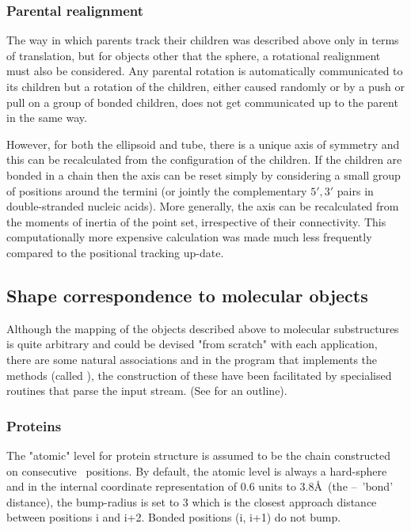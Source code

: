 \subsubsection{Parental realignment}

The way in which parents track their children was described above only in terms of
translation, but for objects other that the sphere, a rotational realignment must also
be considered.   Any parental rotation is automatically communicated to its children but
a rotation of the children, either caused randomly or by a push or pull on a group of
bonded children, does not get communicated up to the parent in the same way.

However, for both the ellipsoid and tube, there is a unique axis of symmetry and this can
be recalculated from the configuration of the children.  If the children are bonded
in a chain then the axis can be reset simply by considering a small group of positions
around the termini (or jointly the complementary $5',3'$ pairs in double-stranded
nucleic acids).   More generally, the axis can be recalculated from the moments
of inertia of the point set, irrespective of their connectivity.
This computationally more expensive calculation was made much less frequently
compared to the positional tracking up-date. 

\subsection{Shape correspondence to molecular objects}

Although the mapping of the objects described above to molecular substructures is quite
arbitrary and could be devised "from scratch" with each application, there are some
natural associations and in the program that implements the methods (called \NAME),
the construction of these have been facilitated by specialised routines that parse
the input stream. (See \cite{TaylorWRet12c} for an outline).

\subsubsection{Proteins}

The "atomic" level for protein structure is assumed to be the chain constructed on
consecutive \CA\ positions.   By default, the atomic level is always a hard-sphere
and in the internal coordinate representation of 0.6 units to 3.8\AA\ (the \CA--\CA\
'bond' distance), the bump-radius is set to 3 which is the closest approach distance 
between positions i and i+2.   Bonded positions (i, i+1) do not bump.  

